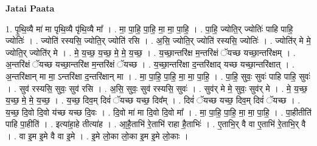 \documentclass[17pt]{extarticle}
\begin{document}
\textbf{Jatai Paata} \newline

1. पृ॒थि॒व्यै मा॑ मा पृथि॒व्यै पृ॑थि॒व्यै मा᳚ । . मा॒ पा॒हि॒ पा॒हि॒ मा॒ मा॒ पा॒हि॒ । . पा॒हि॒ ज्योति॒र् ज्योतिः॑ पाहि पाहि॒ ज्योतिः॑ । . ज्योति॑ रस्यसि॒ ज्योति॒र् ज्योति॑ रसि । . अ॒सि॒ ज्योति॒र् ज्योति॑ रस्यसि॒ ज्योतिः॑ । . ज्योति॑र् मे मे॒ ज्योति॒र् ज्योति॑र् मे । . मे॒ य॒च्छ॒ य॒च्छ॒ मे॒ मे॒ य॒च्छ॒ । . य॒च्छा॒न्तरि॑क्ष म॒न्तरि॑क्षं ॅयच्छ यच्छा॒न्तरि॑क्षम् । . अ॒न्तरि॑क्षं ॅयच्छ यच्छा॒न्तरि॑क्ष म॒न्तरि॑क्षं ॅयच्छ । . य॒च्छा॒न्तरि॑क्षा द॒न्तरि॑क्षाद् यच्छ यच्छा॒न्तरि॑क्षात् । . अ॒न्तरि॑क्षान् मा मा॒ ऽन्तरि॑क्षा द॒न्तरि॑क्षान् मा । . मा॒ पा॒हि॒ पा॒हि॒ मा॒ मा॒ पा॒हि॒ । . पा॒हि॒ सुवः॒ सुवः॑ पाहि पाहि॒ सुवः॑ । . सुव॑ रस्यसि॒ सुवः॒ सुव॑ रसि । . अ॒सि॒ सुवः॒ सुव॑ रस्यसि॒ सुवः॑ । . सुव॑र् मे मे॒ सुवः॒ सुव॑र् मे । . मे॒ य॒च्छ॒ य॒च्छ॒ मे॒ मे॒ य॒च्छ॒ । . य॒च्छ॒ दिव॒म् दिवं॑ ॅयच्छ यच्छ॒ दिव᳚म् । . दिवं॑ ॅयच्छ यच्छ॒ दिव॒म् दिवं॑ ॅयच्छ । . य॒च्छ॒ दि॒वो दि॒वो य॑च्छ यच्छ दि॒वः । . दि॒वो मा॑ मा दि॒वो दि॒वो मा᳚ । . मा॒ पा॒हि॒ पा॒हि॒ मा॒ मा॒ पा॒हि॒ । . पा॒हीतीति॑ पाहि पा॒हीति॑ । . इत्या॑हा॒हे तीत्या॑ह । . आ॒है॒ताभि॑ रे॒ताभि॑ राहा है॒ताभिः॑ । . ए॒ताभि॒र् वै वा ए॒ताभि॑ रे॒ताभि॒र् वै । . वा इ॒म इ॒मे वै वा इ॒मे । . इ॒मे लो॒का लो॒का इ॒म इ॒मे लो॒काः । \newline
\end{document}
